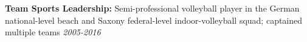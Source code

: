\documentclass[margin,line]{resume}
\begin{document}
\begin{resume}
\begin{list2}
        \item \textbf{Team Sports Leadership:} Semi-professional volleyball player in the German national-level beach and Saxony federal-level indoor-volleyball squad; captained multiple teams \hfill \textsl{2005-2016}
        \end{list2}

\end{resume}   
\end{document}
